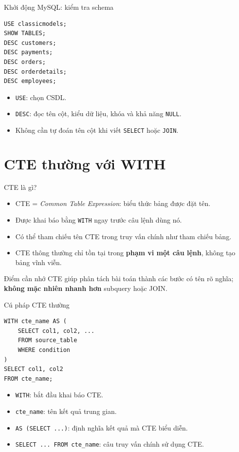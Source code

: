\documentclass[aspectratio=169,10pt]{beamer}
\newcommand{\code}[1]{\texttt{#1}}
\begin{document}
\begin{frame}[fragile]{Khởi động MySQL: kiểm tra schema}
\small
\begin{lstlisting}[basicstyle=\ttfamily\footnotesize]
USE classicmodels;
SHOW TABLES;
DESC customers;
DESC payments;
DESC orders;
DESC orderdetails;
DESC employees;
\end{lstlisting}
\vspace{.1em}
\begin{itemize}
\item \code{USE}: chọn CSDL.
\item \code{DESC}: đọc tên cột, kiểu dữ liệu, khóa và khả năng \code{NULL}.
\item Không cần tự đoán tên cột khi viết \code{SELECT} hoặc \code{JOIN}.
\end{itemize}
\end{frame}

\section{CTE thường với WITH}

\begin{frame}[fragile]{CTE là gì?}
\small
\begin{itemize}
\item CTE = \emph{Common Table Expression}: biểu thức bảng được đặt tên.
\item Được khai báo bằng \code{WITH} ngay trước câu lệnh dùng nó.
\item Có thể tham chiếu tên CTE trong truy vấn chính như tham chiếu bảng.
\item CTE thông thường chỉ tồn tại trong \textbf{phạm vi một câu lệnh}, không tạo bảng vĩnh viễn.
\end{itemize}
\vspace{.3em}\begin{block}{Điểm cần nhớ}
CTE giúp phân tách bài toán thành các bước có tên rõ nghĩa; \textbf{không mặc nhiên nhanh hơn} subquery hoặc JOIN.
\end{block}
\end{frame}

\begin{frame}[fragile]{Cú pháp CTE thường}
\small
\begin{lstlisting}[basicstyle=\ttfamily\footnotesize]
WITH cte_name AS (
    SELECT col1, col2, ...
    FROM source_table
    WHERE condition
)
SELECT col1, col2
FROM cte_name;
\end{lstlisting}
\vspace{.1em}
\begin{itemize}
\item \code{WITH}: bắt đầu khai báo CTE.
\item \code{cte\_name}: tên kết quả trung gian.
\item \code{AS (SELECT ...)}: định nghĩa kết quả mà CTE biểu diễn.
\item \code{SELECT ... FROM cte\_name}: câu truy vấn chính sử dụng CTE.
\end{itemize}
\end{frame}
\end{document}
